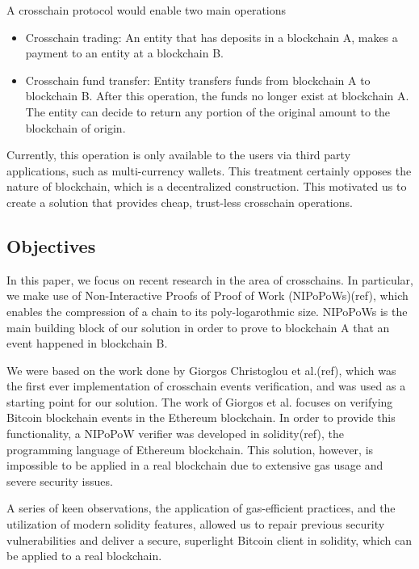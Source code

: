 \documentclass{article}
\begin{document}
  A crosschain protocol would enable two main operations
  \begin{itemize}
  \item
    Crosschain trading: An entity that has deposits in a blockchain A,
    makes a payment to an entity at a blockchain B.
  \item
    Crosschain fund transfer: Entity transfers funds from blockchain A
    to blockchain B. After this operation, the funds no longer exist at
    blockchain A. The entity can decide to return any portion of the
    original amount to the blockchain of origin.
  \end{itemize}

  Currently, this operation is only available to the users via third
  party applications, such as multi-currency wallets. This treatment
  certainly opposes the nature of blockchain, which is a decentralized
  construction. This motivated us to create a solution that provides
  cheap, trust-less crosschain operations.

  \subsection{Objectives}

  In this paper, we focus on recent research in the area of crosschains.
  In particular, we make use of Non-Interactive Proofs of Proof of Work
  (NIPoPoWs)(ref), which enables the compression of a chain to its
  poly-logarothmic size. NIPoPoWs is the main building block of our
  solution in order to prove to blockchain A that an event happened in
  blockchain B.

  We were based on the work done by Giorgos Christoglou et al.(ref),
  which was the first ever implementation of crosschain events
  verification, and was used as a starting point for our solution. The
  work of Giorgos et al. focuses on verifying Bitcoin blockchain events
  in the Ethereum blockchain. In order to provide this functionality, a
  NIPoPoW verifier was developed in solidity(ref), the programming
  language of Ethereum blockchain. This solution, however, is impossible
  to be applied in a real blockchain due to extensive gas usage and
  severe security issues.

  A series of keen observations, the application of gas-efficient
  practices, and the utilization of modern solidity features, allowed us
  to repair previous security vulnerabilities and deliver a secure,
  superlight Bitcoin client in solidity, which can be applied to a real
  blockchain.
\end{document}
